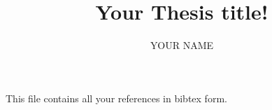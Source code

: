 \documentclass[10pt,a4paper]{book}
\title{Your Thesis title!}
\author{YOUR NAME}
\begin{document}
\frontmatter 
\pagestyle{empty}

\maketitle
\makecertificate{}
\tableofcontents
\listoffigures
\listoftables
	

\mainmatter 
\pagestyle{fancy} 
%


\appendix

 This file contains all your references in bibtex form.
					
\end{document}
